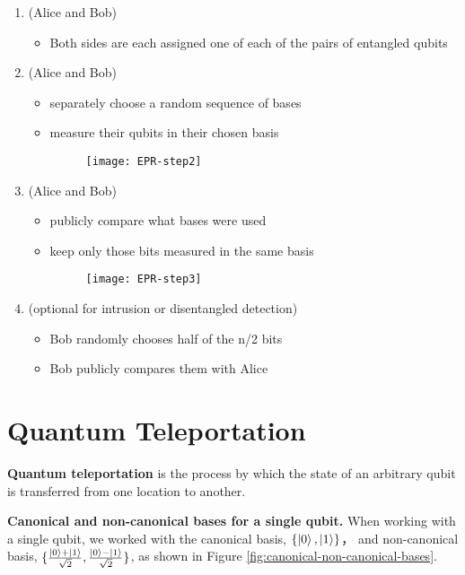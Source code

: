 \documentclass{easyclass}
\begin{document}
\begin{enumerate}
	\item (Alice and Bob) 
		\begin{itemize}
			\item Both sides are each assigned one of each of the pairs of entangled qubits 
		\end{itemize}
	
	\item (Alice and Bob)
		\begin{itemize}
			\item separately choose a random sequence of bases 
			\item measure their qubits in their chosen basis 
			\begin{figure}[h]
				\centering
				\texttt{[image: EPR-step2]}
				\label{fig:EPR-step2}
			\end{figure}
		\end{itemize}
	
	\item (Alice and Bob)
		\begin{itemize}
			\item publicly compare what bases were used  
			\item keep only those bits measured in the same basis
			\begin{figure}[h]
				\centering
				\texttt{[image: EPR-step3]}
				\label{fig:EPR-step3}
			\end{figure}
		\end{itemize}	
	
	\item (optional for intrusion or disentangled detection)
		\begin{itemize}
			\item Bob randomly chooses half of the n/2 bits  
			\item Bob publicly compares them with Alice
		\end{itemize}
	
\end{enumerate}


\section{Quantum Teleportation}
\textbf{Quantum teleportation} is the process by which the state of an arbitrary qubit is transferred from one location to another.

\textbf{Canonical and non-canonical bases for a single qubit.} When working with a single qubit, we worked with the canonical basis, $\{\ket{0},\ket{1}\}$， and non-canonical basis, $\{\frac{\ket{0}+\ket{1}}{\sqrt{2}}, \frac{\ket{0}-\ket{1}}{\sqrt{2}}\}$, as shown in Figure \ref{fig:canonical-non-canonical-bases}. 
\end{document}
